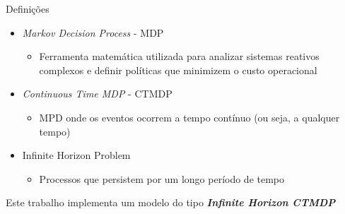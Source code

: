 \begin{frame}
  \begin{block}{Definições}
    \begin{itemize}
      \pause
      \item \alert{\textit{Markov Decision Process} - MDP}
      \begin{itemize}
        \item Ferramenta matemática utilizada para analizar sistemas
        \alert{reativos} complexos e definir \alert{políticas} que minimizem o
        \alert{custo} operacional
      \end{itemize}
      \pause
      \item \alert{\textit{Continuous Time MDP} - CTMDP}
      \begin{itemize}
        \item MPD onde os eventos ocorrem a tempo contínuo (ou seja, a qualquer
        tempo)
      \end{itemize}
      \pause
      \item \alert{Infinite Horizon Problem}
      \begin{itemize}
        \item Processos que persistem por um longo período de tempo
      \end{itemize}
    \end{itemize}
  \end{block}
  \pause
  Este trabalho implementa um modelo do tipo \textit{\textbf{Infinite Horizon
  CTMDP}}
\end{frame}

